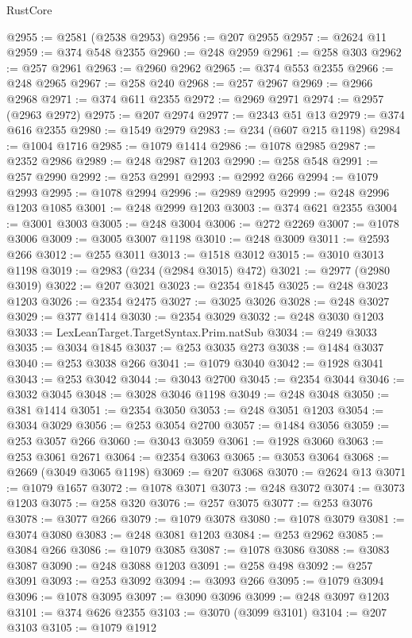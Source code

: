 \begin{lexlean}{RustCore}
\begin{coremodule}
@2955 := @2581 (@2538 @2953)
@2956 := @207 @2955
@2957 := @2624 @11
@2959 := @374 @548 @2355
@2960 := @248 @2959
@2961 := @258 @303
@2962 := @257 @2961
@2963 := @2960 @2962
@2965 := @374 @553 @2355
@2966 := @248 @2965
@2967 := @258 @240
@2968 := @257 @2967
@2969 := @2966 @2968
@2971 := @374 @611 @2355
@2972 := @2969 @2971
@2974 := @2957 (@2963 @2972)
@2975 := @207 @2974
@2977 := @2343 @51 @13
@2979 := @374 @616 @2355
@2980 := @1549 @2979
@2983 := @234 (@607 @215 @1198)
@2984 := @1004 @1716
@2985 := @1079 @1414
@2986 := @1078 @2985
@2987 := @2352 @2986
@2989 := @248 @2987 @1203
@2990 := @258 @548
@2991 := @257 @2990
@2992 := @253 @2991
@2993 := @2992 @266
@2994 := @1079 @2993
@2995 := @1078 @2994
@2996 := @2989 @2995
@2999 := @248 @2996 @1203 @1085
@3001 := @248 @2999 @1203
@3003 := @374 @621 @2355
@3004 := @3001 @3003
@3005 := @248 @3004
@3006 := @272 @2269
@3007 := @1078 @3006
@3009 := @3005 @3007 @1198
@3010 := @248 @3009
@3011 := @2593 @266
@3012 := @255 @3011
@3013 := @1518 @3012
@3015 := @3010 @3013 @1198
@3019 := @2983 (@234 (@2984 @3015) @472)
@3021 := @2977 (@2980 @3019)
@3022 := @207 @3021
@3023 := @2354 @1845
@3025 := @248 @3023 @1203
@3026 := @2354 @2475
@3027 := @3025 @3026
@3028 := @248 @3027
@3029 := @377 @1414
@3030 := @2354 @3029
@3032 := @248 @3030 @1203
@3033 := LexLeanTarget.TargetSyntax.Prim.natSub
@3034 := @249 @3033
@3035 := @3034 @1845
@3037 := @253 @3035 @273
@3038 := @1484 @3037
@3040 := @253 @3038 @266
@3041 := @1079 @3040
@3042 := @1928 @3041
@3043 := @253 @3042
@3044 := @3043 @2700
@3045 := @2354 @3044
@3046 := @3032 @3045
@3048 := @3028 @3046 @1198
@3049 := @248 @3048
@3050 := @381 @1414
@3051 := @2354 @3050
@3053 := @248 @3051 @1203
@3054 := @3034 @3029
@3056 := @253 @3054 @2700
@3057 := @1484 @3056
@3059 := @253 @3057 @266
@3060 := @3043 @3059
@3061 := @1928 @3060
@3063 := @253 @3061 @2671
@3064 := @2354 @3063
@3065 := @3053 @3064
@3068 := @2669 (@3049 @3065 @1198)
@3069 := @207 @3068
@3070 := @2624 @13
@3071 := @1079 @1657
@3072 := @1078 @3071
@3073 := @248 @3072
@3074 := @3073 @1203
@3075 := @258 @320
@3076 := @257 @3075
@3077 := @253 @3076
@3078 := @3077 @266
@3079 := @1079 @3078
@3080 := @1078 @3079
@3081 := @3074 @3080
@3083 := @248 @3081 @1203
@3084 := @253 @2962
@3085 := @3084 @266
@3086 := @1079 @3085
@3087 := @1078 @3086
@3088 := @3083 @3087
@3090 := @248 @3088 @1203
@3091 := @258 @498
@3092 := @257 @3091
@3093 := @253 @3092
@3094 := @3093 @266
@3095 := @1079 @3094
@3096 := @1078 @3095
@3097 := @3090 @3096
@3099 := @248 @3097 @1203
@3101 := @374 @626 @2355
@3103 := @3070 (@3099 @3101)
@3104 := @207 @3103
@3105 := @1079 @1912

\end{coremodule}
\end{lexlean}
